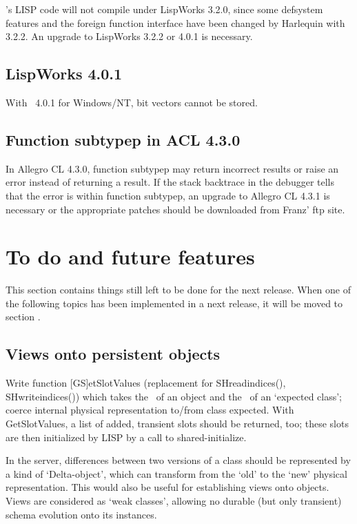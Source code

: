 \plobwoexcl's LISP code will not compile under LispWorks 3.2.0, since
some defsystem features and the foreign function interface have been
changed by Harlequin with 3.2.2. An upgrade to LispWorks 3.2.2 or
4.0.1 is necessary.

\subsection{LispWorks 4.0.1}

With \lwcl\ 4.0.1 for Windows/NT, bit vectors cannot be stored.

\subsection{Function subtypep in ACL 4.3.0}

In Allegro CL 4.3.0, function subtypep may return incorrect results or
raise an error instead of returning a result. If the stack backtrace
in the debugger tells that the error is within function subtypep,
an upgrade to Allegro CL 4.3.1 is necessary or the appropriate
patches should be downloaded from Franz' ftp site.

\section{To do and future features}

This section contains things still left to be done for the next
release. When one of the following topics has been implemented in a
next release, it will be moved to section .

\subsection{Views onto persistent objects}%
\label{sec:Views}

Write function [GS]etSlotValues (replacement for
SH\us{}read\us{}indices(), SH\us{}write\us{}indices()) which takes the
\objid\ of an object and the \objid\ of an `expected class'; coerce
internal physical representation to/from class expected. With
GetSlotValues, a list of added, transient slots should be returned,
too; these slots are then initialized by LISP by a call to
shared-initialize.

In the server, differences between two versions of a class should be
represented by a kind of `Delta-object', which can transform from the
`old' to the `new' physical representation. This would also be useful
for establishing views onto objects. Views are considered as `weak
classes', allowing no durable (but only transient) schema evolution
onto its instances.

